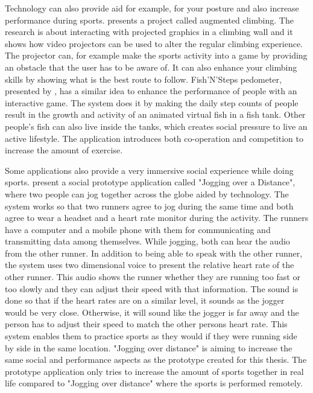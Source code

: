 Technology can also provide aid for example, for your posture and also increase performance during sports. \cite{augmentedClimbing} presents a project called augmented climbing. The research is about interacting with projected graphics in a climbing wall and it shows how video projectors can be used to alter the regular climbing experience. The projector can, for example make the sports activity into a game by providing an obstacle that the user has to be aware of. It can also enhance your climbing skills by showing what is the best route to follow. Fish’N’Steps pedometer, presented by \cite{fishGame}, has a similar idea to enhance the performance of people with an interactive game. The system does it by making the daily step counts of people result in the growth and activity of an animated virtual fish in a fish tank. Other people's fish can also live inside the tanks, which creates social pressure to live an active lifestyle. The application introduces both co-operation and competition to increase the amount of exercise.

Some applications also provide a very immersive social experience while doing sports.\cite{joggingOverDistance} present a social prototype application called "Jogging over a Distance", where two people can jog together across the globe aided by technology. The system works so that two runners agree to jog during the same time and both agree to wear a headset and a heart rate monitor during the activity. The runners have a computer and a mobile phone with them for communicating and transmitting data among themselves. While jogging, both can hear the audio from the other runner. In addition to being able to speak with the other runner, the system uses two dimensional voice to present the relative heart rate of the other runner. This audio shows the runner whether they are running too fast or too slowly and they can adjust their speed with that information. The sound is done so that if the heart rates are on a similar level, it sounds as the jogger would be very close. Otherwise, it will sound like the jogger is far away and the person has to adjust their speed to match the other persons heart rate. This system enables them to practice sports as they would if they were running side by side in the same location. "Jogging over distance" is aiming to increase the same social and performance aspects as the prototype created for this thesis. The prototype application only tries to increase the amount of sports together in real life compared to "Jogging over distance" where the sports is performed remotely.

